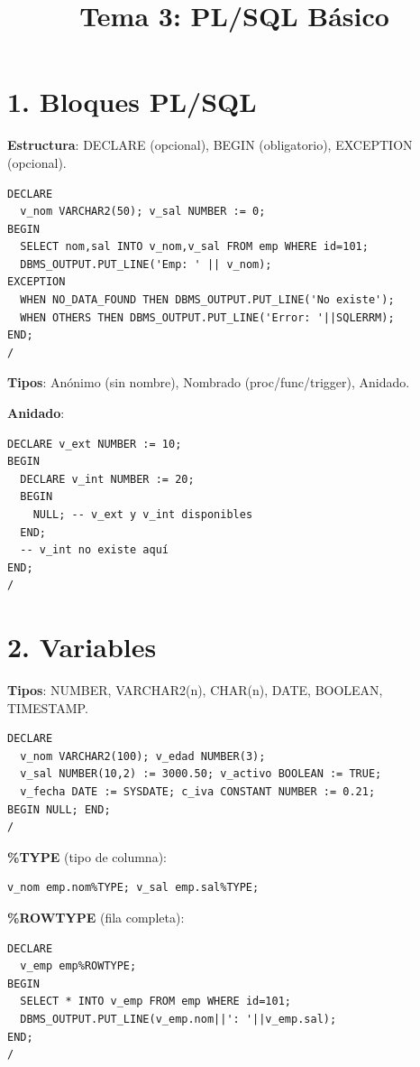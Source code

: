 \documentclass[8pt,a4paper,twocolumn]{article}
\title{\textbf{Tema 3: PL/SQL Básico}}
\author{}
\date{}
\begin{document}
\tiny

\maketitle

\section*{1. Bloques PL/SQL}

\textbf{Estructura}: DECLARE (opcional), BEGIN (obligatorio), EXCEPTION (opcional).

\begin{lstlisting}
DECLARE
  v_nom VARCHAR2(50); v_sal NUMBER := 0;
BEGIN
  SELECT nom,sal INTO v_nom,v_sal FROM emp WHERE id=101;
  DBMS_OUTPUT.PUT_LINE('Emp: ' || v_nom);
EXCEPTION
  WHEN NO_DATA_FOUND THEN DBMS_OUTPUT.PUT_LINE('No existe');
  WHEN OTHERS THEN DBMS_OUTPUT.PUT_LINE('Error: '||SQLERRM);
END;
/
\end{lstlisting}

\textbf{Tipos}: Anónimo (sin nombre), Nombrado (proc/func/trigger), Anidado.

\textbf{Anidado}:
\begin{lstlisting}
DECLARE v_ext NUMBER := 10;
BEGIN
  DECLARE v_int NUMBER := 20;
  BEGIN
    NULL; -- v_ext y v_int disponibles
  END;
  -- v_int no existe aquí
END;
/
\end{lstlisting}

\section*{2. Variables}

\textbf{Tipos}: NUMBER, VARCHAR2(n), CHAR(n), DATE, BOOLEAN, TIMESTAMP.

\begin{lstlisting}
DECLARE
  v_nom VARCHAR2(100); v_edad NUMBER(3);
  v_sal NUMBER(10,2) := 3000.50; v_activo BOOLEAN := TRUE;
  v_fecha DATE := SYSDATE; c_iva CONSTANT NUMBER := 0.21;
BEGIN NULL; END;
/
\end{lstlisting}

\textbf{\%TYPE} (tipo de columna):
\begin{lstlisting}
v_nom emp.nom%TYPE; v_sal emp.sal%TYPE;
\end{lstlisting}

\textbf{\%ROWTYPE} (fila completa):
\begin{lstlisting}
DECLARE
  v_emp emp%ROWTYPE;
BEGIN
  SELECT * INTO v_emp FROM emp WHERE id=101;
  DBMS_OUTPUT.PUT_LINE(v_emp.nom||': '||v_emp.sal);
END;
/
\end{lstlisting}
\end{document}
